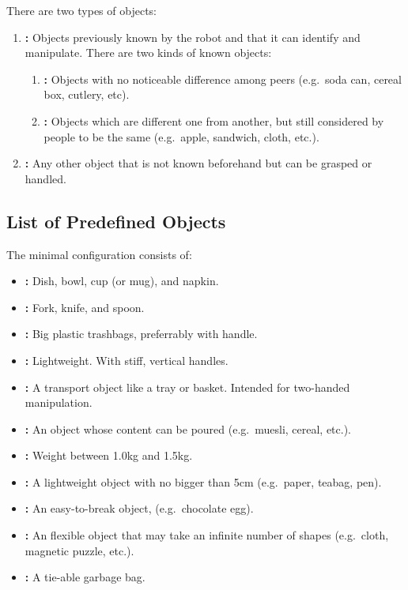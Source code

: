 There are two types of objects:

\begin{enumerate}
	\item \textbf{:} Objects previously known by the robot and that it can identify and manipulate.
	There are two kinds of known objects:
	\begin{enumerate}
		\item \textbf{:} Objects with no noticeable difference among peers (e.g.~soda can, cereal box, cutlery, etc).
		\item \textbf{:} Objects which are different one from another, but still considered by people to be the same (e.g.~apple, sandwich, cloth, etc.).
	\end{enumerate}

	\item \textbf{:} Any other object that is not known beforehand but can be grasped or handled.
\end{enumerate}

\subsection{List of Predefined Objects}
\label{rule:scenario_objects_list}
The minimal configuration consists of:
\begin{itemize}
	\item \textbf{:} Dish, bowl, cup (or mug), and napkin.
	\item \textbf{:} Fork, knife, and spoon.
	\item \textbf{:} Big plastic trashbags, preferrably with handle.
	\item \textbf{:} Lightweight. With stiff, vertical handles.
	\item \textbf{:} A transport object like a tray or basket. Intended for two-handed manipulation.
	\item \textbf{:} An object whose content can be poured (e.g.~muesli, cereal, etc.).
	\item \textbf{:} Weight between 1.0kg and 1.5kg.
	\item \textbf{:} A lightweight object with no bigger than 5cm (e.g.~paper, teabag, pen).
	\item \textbf{:} An easy-to-break object, (e.g.~chocolate egg).
	\item \textbf{:} An flexible object that may take an infinite number of shapes (e.g.~cloth, magnetic puzzle, etc.).
	\item \textbf{:} A tie-able garbage bag.
\end{itemize}

